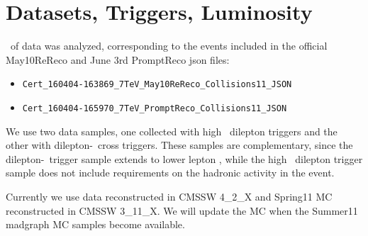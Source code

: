 \section{Datasets, Triggers, Luminosity}
\label{sec:datasets}

\lumi\ of data was analyzed, corresponding to the events included in the official May10ReReco and June 3rd PromptReco json files: 
\begin{itemize}
  \item \verb=Cert_160404-163869_7TeV_May10ReReco_Collisions11_JSON=
  \item \verb=Cert_160404-165970_7TeV_PromptReco_Collisions11_JSON=
\end{itemize}

We use two data samples, one collected with high \pt\ dilepton triggers and the other 
with dilepton-\Ht\ cross triggers. These samples are complementary, since the dilepton-\Ht\
trigger sample extends to lower lepton \pt, while the high \pt\ dilepton trigger sample 
does not include requirements on the hadronic activity in the event. 

Currently we use data reconstructed in CMSSW 4\_2\_X and Spring11 MC reconstructed in CMSSW 3\_11\_X.
We will update the MC  when the Summer11 madgraph MC samples become available.

